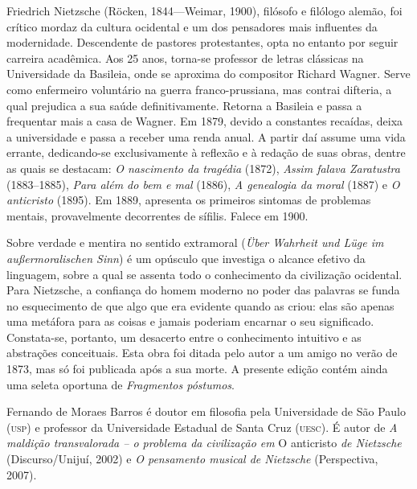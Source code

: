 \begin{resumopage}
\item[Friedrich Nietzsche] (Röcken, 1844---Weimar, 1900), filósofo 
e filólogo alemão, foi crítico mordaz da cultura ocidental 
e um dos pensadores mais influentes da modernidade. Descendente de pastores 
protestantes, opta no entanto por seguir carreira acadêmica. 
Aos 25 anos, torna-se professor de letras clássicas na Universidade 
da Basileia, onde se aproxima do compositor Richard Wagner. Serve 
como enfermeiro voluntário na guerra franco-prussiana, mas contrai 
difteria, a qual prejudica a sua saúde definitivamente. Retorna a 
Basileia e passa a frequentar mais a casa de Wagner. Em 
1879, devido a constantes recaídas, deixa a universidade e passa a 
receber uma renda anual. A partir daí assume uma vida errante, 
dedicando-se exclusivamente à reflexão e à redação de suas obras, 
dentre as quais se destacam: \textit{O nascimento da tragédia} (1872), 
\textit{Assim falava Zaratustra} (1883--1885), \textit{Para além do bem e mal} (1886), 
\textit{A genealogia da moral} (1887) e \textit{O anticristo} (1895). Em 1889, 
apresenta os primeiros sintomas de problemas mentais, provavelmente 
decorrentes de sífilis. Falece em 1900.

\item[Sobre verdade e mentira no sentido extramoral] (\textit{Über Wahrheit 
und Lüge im außermoralischen Sinn}) é um opúsculo que investiga 
o alcance efetivo da linguagem, sobre a qual se assenta todo o 
conhecimento da civilização ocidental. Para Nietzsche, a confiança do 
homem moderno no poder das palavras se funda no esquecimento de que 
algo que era evidente quando as criou: elas são apenas uma metáfora 
para as coisas e jamais poderiam encarnar o seu significado. 
Constata-se, portanto, um desacerto entre o conhecimento intuitivo 
e as abstrações conceituais. Esta obra foi ditada pelo autor a um amigo 
no verão de 1873, mas só foi publicada após a sua morte. A presente 
edição contém ainda uma seleta oportuna de \textit{Fragmentos póstumos}.

\item[Fernando de Moraes Barros] é doutor em filosofia pela Universidade 
de São Paulo (\textsc{usp}) e professor 
da Universidade Estadual de Santa Cruz 
(\textsc{uesc}). É autor de 
\textit{A maldição transvalorada -- o problema da civilização 
em} O anticristo \textit{de Nietzsche} (Discurso/Unijuí, 2002) 
e \textit{O pensamento 
musical de Nietzsche} (Perspectiva, 2007).

\end{resumopage}
